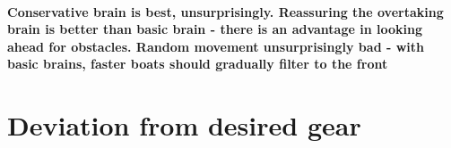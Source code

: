   \paragraph{Conservative brain is best, unsurprisingly. Reassuring the overtaking brain is better than basic brain - there is an advantage in looking ahead for obstacles. Random movement unsurprisingly bad - with basic brains, faster boats should gradually filter to the front}
  
\section{Deviation from desired gear}